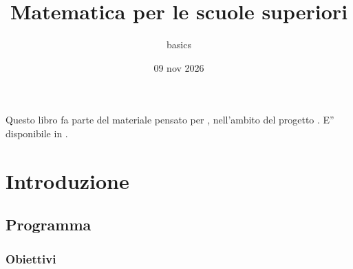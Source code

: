 \documentclass[letterpaper,10pt,italian]{jupyterBook}
\title{Matematica per le scuole superiori}
\date{09 nov 2026}
\author{basics}
\begin{document}
\pagestyle{empty}
\sphinxmaketitle
\pagestyle{plain}
\sphinxtableofcontents
\pagestyle{normal}
\label{\detokenize{intro::doc}}


\sphinxAtStartPar
Questo libro fa parte del materiale pensato per , nell’ambito del progetto . E” disponibile in .



\sphinxAtStartPar
{\hyperref[\detokenize{ch/program:math-hs-intro-how-to}]{}}

\sphinxstepscope


\part{Introduzione}

\sphinxstepscope


\chapter{Programma}
\label{\detokenize{ch/program:programma}}\label{\detokenize{ch/program::doc}}

\section{Obiettivi}
\label{\detokenize{ch/program:obiettivi}}
\end{document}

